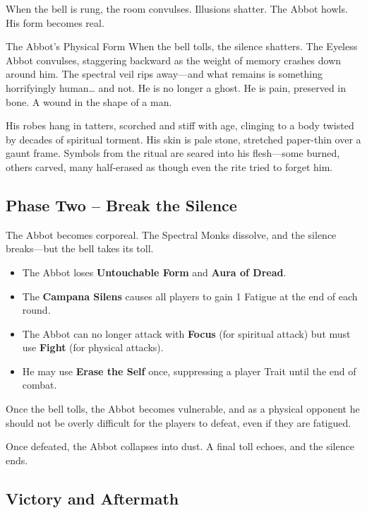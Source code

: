When the bell is rung, the room convulses. Illusions shatter. The Abbot howls. His form becomes real.

\begin{Example}{The Abbot's Physical Form}
    When the bell tolls, the silence shatters.  The Eyeless Abbot convulses, staggering backward as the weight of memory crashes down around him. The spectral veil rips away—and what remains is something horrifyingly human… and not. He is no longer a ghost. He is pain, preserved in bone. A wound in the shape of a man.
    
    His robes hang in tatters, scorched and stiff with age, clinging to a body twisted by decades of spiritual torment. His skin is pale stone, stretched paper-thin over a gaunt frame. Symbols from the ritual are seared into his flesh—some burned, others carved, many half-erased as though even the rite tried to forget him.
\end{Example}


\subsection*{Phase Two – Break the Silence}

The Abbot becomes corporeal. The Spectral Monks dissolve, and the silence breaks—but the bell takes its toll.
\begin{Example}{}
    \begin{itemize}
    \item The Abbot loses \textbf{Untouchable Form} and \textbf{Aura of Dread}.
    \item The \textbf{Campana Silens} causes all players to gain 1 Fatigue at the end of each round.
    \item The Abbot can no longer attack with \textbf{Focus} (for spiritual attack) but must use \textbf{Fight} (for physical attacks).
    \item He may use \textbf{Erase the Self} once, suppressing a player Trait until the end of combat.
    \end{itemize}
\end{Example}

Once the bell tolls, the Abbot becomes vulnerable, and as a physical opponent he should not be overly difficult for the players to defeat, even if they are fatigued. 

Once defeated, the Abbot collapses into dust. A final toll echoes, and the silence ends.



\subsection*{Victory and Aftermath}

